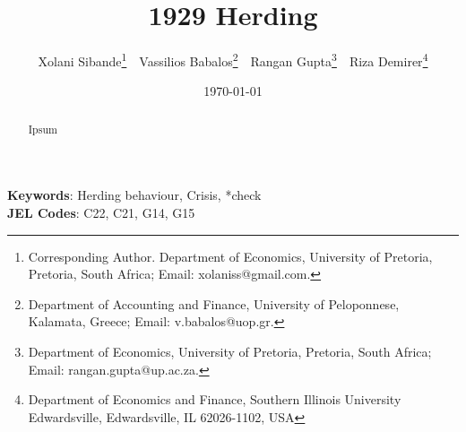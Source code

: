
\title{1929 Herding}


\author { Xolani Sibande\footnote{Corresponding Author. Department of Economics, University of Pretoria, Pretoria, South Africa; Email: xolaniss@gmail.com.} \,\, 
Vassilios Babalos\footnote{Department of Accounting and Finance, University of Peloponnese, Kalamata,  Greece; Email: v.babalos@uop.gr.} \,\,
Rangan Gupta\footnote{ Department of Economics, University of Pretoria, Pretoria, South Africa; Email: rangan.gupta@up.ac.za.} \,\,
Riza Demirer\footnote{Department of Economics and Finance, Southern Illinois University Edwardsville, Edwardsville, IL 62026-1102, USA}}
\date{\today}
\maketitle

\begin{abstract}
Ipsum

\end{abstract}

\noindent\textbf{Keywords}: Herding behaviour, Crisis, *check
\\
\textbf{JEL Codes}: C22, C21, G14, G15
\newpage
